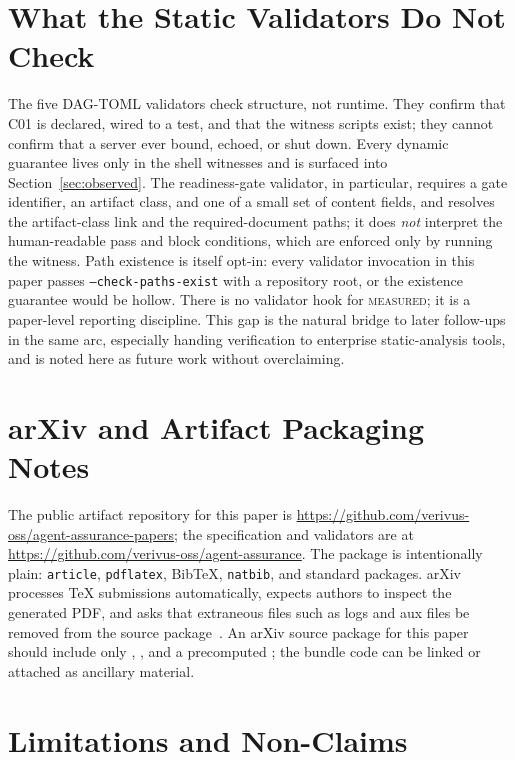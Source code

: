 \documentclass[11pt,letterpaper]{article}
\newcommand{\dagtoml}{DAG-TOML}
\newcommand{\measured}{\textsc{measured}}
\begin{document}
\section{What the Static Validators Do Not Check}
\label{sec:nostatic}

The five \dagtoml{} validators check structure, not runtime. They
confirm that C01 is declared, wired to a test, and that the witness
scripts exist; they cannot confirm that a server ever bound, echoed, or
shut down. Every dynamic guarantee lives only in the shell witnesses and
is surfaced into Section~\ref{sec:observed}. The readiness-gate
validator, in particular, requires a gate identifier, an artifact class,
and one of a small set of content fields, and resolves the artifact-class
link and the required-document paths; it does \emph{not} interpret the
human-readable pass and block conditions, which are enforced only by
running the witness. Path existence is itself opt-in: every validator
invocation in this paper passes \texttt{--check-paths-exist} with a
repository root, or the existence guarantee would be hollow. There is no
validator hook for \measured{}; it is a paper-level reporting discipline.
This gap is the natural bridge to later follow-ups in the same arc,
especially handing verification to enterprise static-analysis tools, and
is noted here as future work without overclaiming.

\section{arXiv and Artifact Packaging Notes}

The public artifact repository for this paper is
\url{https://github.com/verivus-oss/agent-assurance-papers}; the
specification and validators are at
\url{https://github.com/verivus-oss/agent-assurance}. The package is
intentionally plain: \texttt{article}, \texttt{pdflatex}, BibTeX,
\texttt{natbib}, and standard packages. arXiv processes TeX submissions
automatically, expects authors to inspect the generated PDF, and asks
that extraneous files such as logs and aux files be removed from the
source package~\cite{arxivSubmitTex2026,arxivTexLive2026}. An arXiv
source package for this paper should include only ,
, and a precomputed ; the bundle code
can be linked or attached as ancillary material.

\section{Limitations and Non-Claims}
\end{document}
